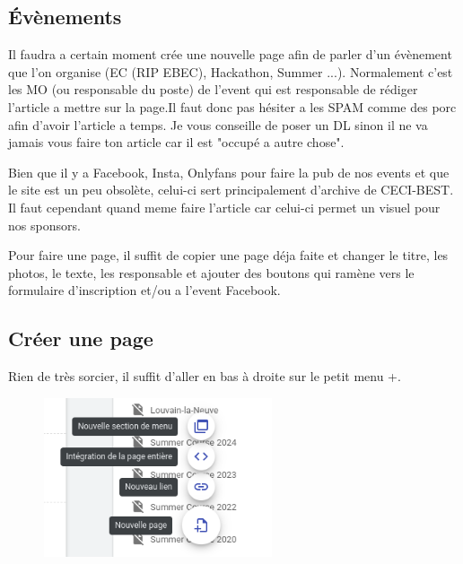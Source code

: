\documentclass[12pt]{article}
\begin{document}
	 \subsection{Évènements}
	 	Il faudra a certain moment crée une nouvelle page afin de parler d'un évènement que l'on organise (EC (RIP EBEC), Hackathon, Summer ...). Normalement c'est les MO (ou responsable du poste) de l'event qui est responsable de rédiger l'article a mettre sur la page.Il faut donc pas hésiter a les SPAM comme des porc afin d'avoir l'article a temps. Je vous conseille de poser un DL sinon il ne va jamais vous faire ton article car il est "occupé a autre chose".
	 	
	 	Bien que il y a Facebook, Insta, Onlyfans pour faire la pub de nos events et que le site est un peu obsolète, celui-ci sert principalement d'archive de CECI-BEST. Il faut cependant quand meme faire l'article car celui-ci permet un visuel pour nos sponsors.
	 	
	 	Pour faire une page, il suffit de copier une page déja faite et changer le titre, les photos, le texte, les responsable et ajouter des boutons qui ramène vers le formulaire d'inscription et/ou a l'event Facebook.
	\newpage
	 \subsection{Créer une page}
	 	Rien de très sorcier, il suffit d'aller en bas à droite sur le petit menu +.
	 	\begin{figure}[htp]
			\centering
			\includegraphics[width=0.6\textwidth]{img/CreerPage.png}
		\end{figure}
		
\end{document}
